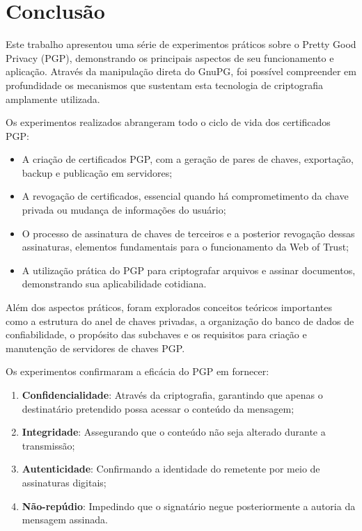 \chapter{Conclusão}

Este trabalho apresentou uma série de experimentos práticos sobre o Pretty Good Privacy (PGP), demonstrando os principais aspectos de seu funcionamento e aplicação. Através da manipulação direta do GnuPG, foi possível compreender em profundidade os mecanismos que sustentam esta tecnologia de criptografia amplamente utilizada.

Os experimentos realizados abrangeram todo o ciclo de vida dos certificados PGP:

\begin{itemize}
    \item A criação de certificados PGP, com a geração de pares de chaves, exportação, backup e publicação em servidores;
    \item A revogação de certificados, essencial quando há comprometimento da chave privada ou mudança de informações do usuário;
    \item O processo de assinatura de chaves de terceiros e a posterior revogação dessas assinaturas, elementos fundamentais para o funcionamento da Web of Trust;
    \item A utilização prática do PGP para criptografar arquivos e assinar documentos, demonstrando sua aplicabilidade cotidiana.
\end{itemize}

Além dos aspectos práticos, foram explorados conceitos teóricos importantes como a estrutura do anel de chaves privadas, a organização do banco de dados de confiabilidade, o propósito das subchaves e os requisitos para criação e manutenção de servidores de chaves PGP.

Os experimentos confirmaram a eficácia do PGP em fornecer:

\begin{enumerate}
    \item \textbf{Confidencialidade}: Através da criptografia, garantindo que apenas o destinatário pretendido possa acessar o conteúdo da mensagem;
    \item \textbf{Integridade}: Assegurando que o conteúdo não seja alterado durante a transmissão;
    \item \textbf{Autenticidade}: Confirmando a identidade do remetente por meio de assinaturas digitais;
    \item \textbf{Não-repúdio}: Impedindo que o signatário negue posteriormente a autoria da mensagem assinada.
\end{enumerate}

